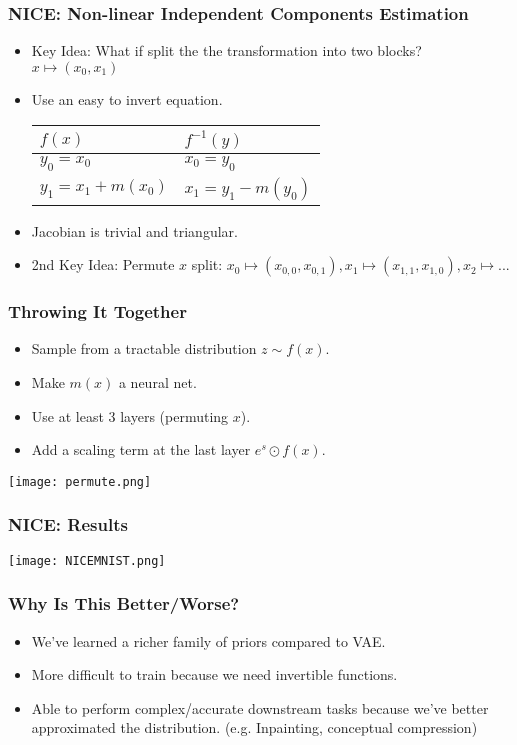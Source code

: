 \begin{frame}
    \frametitle{NICE: Non-linear Independent Components Estimation}
    \begin{itemize}
        \item<1-> Key Idea: What if split the the transformation into two
            blocks? $x \mapsto (x_0, x_1)$
        \item<2-> Use an easy to invert equation.\\
            \begin{tabular}{|l|l|}
                \hline
                $f(x)$ & $f^{-1}(y)$\\
                \hline
                $y_0 = x_0$ & $x_0 = y_0$\\
                $y_1 = x_1 + m(x_0)$ & $x_1 = y_1 - m(y_0)$
                \\\hline
            \end{tabular}
        \item<3->Jacobian is trivial and triangular.
        \item<4->2nd Key Idea: Permute $x$ split: $x_0 \mapsto (x_{0,0}, x_{0,1}), x_1
            \mapsto (x_{1,1}, x_{1,0}), x_2 \mapsto...$
    \end{itemize}
\end{frame}

\begin{frame}
    \frametitle{Throwing It Together}
    \begin{itemize}
        \item Sample from a tractable distribution $z\sim f(x)$.
        \item Make $m(x)$ a neural net.
        \item Use at least 3 layers (permuting $x$).
        \item Add a scaling term at the last layer $e^s\odot f(x)$.
    \end{itemize}
    \center\texttt{[image: permute.png]}
\end{frame}

\begin{frame}
    \frametitle{NICE: Results}
    \center\texttt{[image: NICEMNIST.png]}
\end{frame}

\begin{frame}
    \frametitle{Why Is This Better/Worse?}
    \begin{itemize}
        \item We've learned a richer family of priors compared to VAE.
        \item More difficult to train because we need invertible functions.
        \item Able to perform complex/accurate downstream tasks because we've
            better approximated the distribution. (e.g. Inpainting, conceptual
            compression)
    \end{itemize}
\end{frame}

